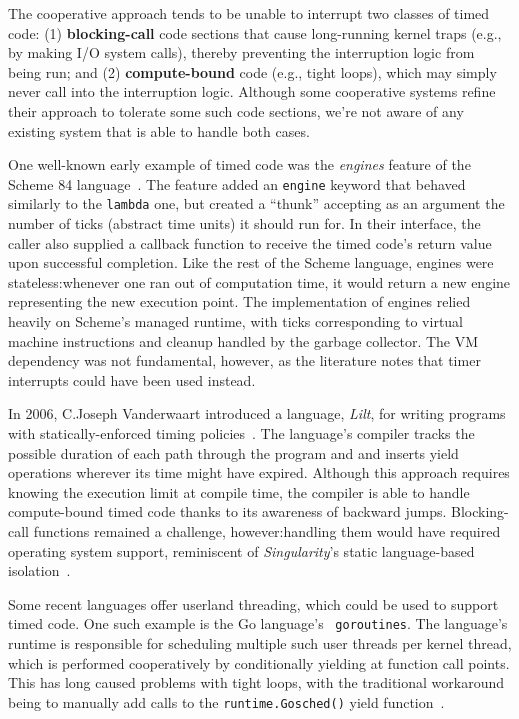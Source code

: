 
The cooperative approach tends to be unable to interrupt two classes of timed code:\@
(1) \textbf{blocking-call} code sections that cause
long-running kernel traps (e.g., by making I/O system calls),
thereby preventing the interruption logic from being run; and (2)
\textbf{compute-bound} code (e.g., tight loops), which may simply never call into the
interruption logic.  Although some cooperative systems refine their approach to
tolerate some such code sections, we're not aware of any existing system that is able
to handle both cases.

One well-known early example of timed code was the \textit{engines} feature of
the Scheme 84 language~\cite{haynes:iucs1984}.  The feature added an \texttt{engine}
keyword that behaved similarly to the \texttt{lambda} one, but created a ``thunk''
accepting as an argument the number of ticks (abstract time units) it should run for.
In their interface, the caller also supplied a callback function to receive the
timed code's return value upon successful completion.  Like the rest of the
Scheme language, engines were stateless:\@ whenever one ran out of computation time,
it would return a new engine representing the new execution point.  The
implementation of engines relied heavily on Scheme's managed runtime, with ticks
corresponding to virtual machine instructions and cleanup handled by the garbage
collector.  The VM dependency was not fundamental, however, as the literature notes
that timer interrupts could have been used instead.

In 2006, C.\@ Joseph Vanderwaart introduced a language, \textit{Lilt}, for writing
programs with statically-enforced timing policies~\cite{vanderwaart:cmucs2006}.  The
language's compiler tracks the possible duration of each path through the program and
and inserts yield operations wherever its time might have expired.  Although this
approach requires knowing the execution limit at compile time, the compiler is able
to handle compute-bound timed code thanks to its awareness of backward jumps.
Blocking-call functions remained a challenge, however:\@ handling them would have
required
operating system support, reminiscent of \textit{Singularity}'s static language-based
isolation~\cite{hunt:msr2005}.

Some recent languages offer userland threading, which could be used to support timed
code.  One such example is the Go language's~\cite{www-golang} \texttt{goroutines}.
The language's runtime is responsible for scheduling multiple such user
threads per kernel thread, which is performed cooperatively by conditionally yielding
at function call points.  This has long caused problems with tight loops, with the
traditional workaround being to manually add calls to the \texttt{runtime.Gosched()}
yield function~\cite{www-golang-tightloop}.

